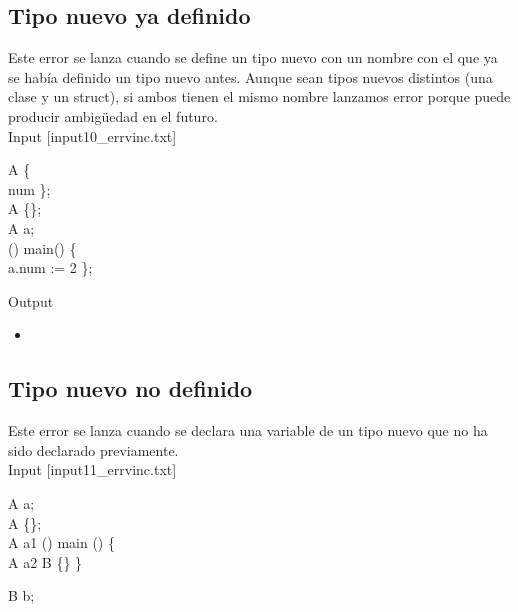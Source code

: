 \subsection{Tipo nuevo ya definido}

Este error se lanza cuando se define un tipo nuevo con un nombre con el que ya se había definido
un tipo nuevo antes. Aunque sean tipos nuevos distintos (una clase y un struct), si ambos tienen el mismo
nombre lanzamos error porque puede producir ambigüedad en el futuro. \\

Input [input10\_errvinc.txt]

\begin{algorithm}
	\Class A \{\\
		\quad \Integer{} num\;
	\};\\
	\Struct A \{\};  \\
	\Class A a;  \\
	\Integer{}() main() \{\\
	\quad a.num := 2\;
	\};
\end{algorithm}

Output

\begin{itemize}
	\item {}
\end{itemize}

\subsection{Tipo nuevo no definido}

Este error se lanza cuando se declara una variable de un tipo nuevo que no ha sido declarado previamente. \\

Input [input11\_errvinc.txt]

\begin{algorithm}
	\Struct A a; \\
	\Struct A \{\}; \\
	\Struct A a1\; 
	\Integer{} () main () \{\\
		\quad \Struct A a2\;
		\quad \Struct B \{\}\;
	\}\;

	\Struct B b; \\
\end{algorithm}

